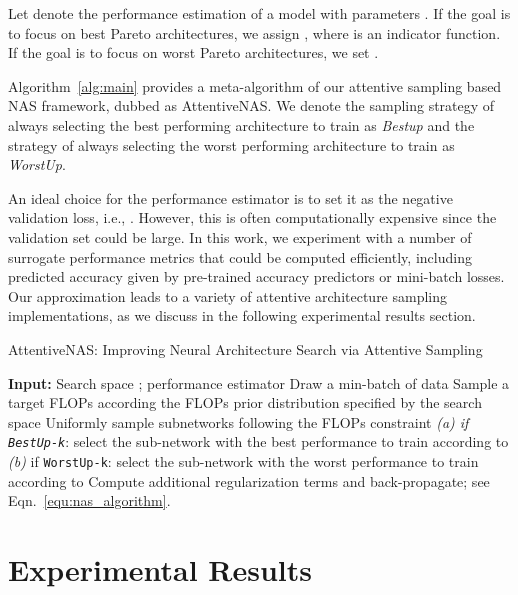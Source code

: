 \documentclass[final]{cvpr}
\theoremstyle{definition}
\begin{document}
Let  denote the performance estimation of a model  with parameters .
If the goal is to focus on best {Pareto} architectures, 
we assign , where  is an indicator function. 
If the goal is to focus on worst {Pareto} architectures, 
we set . 

Algorithm~\ref{alg:main} provides a meta-algorithm of our attentive sampling based NAS framework, dubbed as {AttentiveNAS}. 
We denote the sampling strategy of always selecting the best performing architecture to train as \textit{Bestup} and the strategy of always selecting the worst performing architecture to train as \textit{WorstUp}.

An ideal choice for the performance estimator  is to set it as the negative validation loss, i.e., . 
However, this is often computationally expensive since the validation set could be large. 
In this work, 
we experiment with a number of surrogate performance metrics that could be computed efficiently,
including predicted accuracy given by pre-trained accuracy predictors or mini-batch losses.
Our approximation leads to a variety of attentive architecture sampling implementations, 
as we discuss in the following experimental results section.




\begin{algorithm}[t]
\caption{AttentiveNAS: Improving Neural Architecture Search via Attentive Sampling}
\label{alg:main}
\begin{algorithmic}[1]
    \STATE \textbf{Input:} Search space ; performance estimator 
        \STATE Draw a min-batch of data
        \FOR{} 
        \STATE Sample a target FLOPs  according the FLOPs prior distribution specified by the search space 
        \STATE Uniformly sample  subnetworks  following the FLOPs constraint  
        \STATE \emph{(a) if \texttt{BestUp-k}}: select the sub-network with the best performance to train according to 
        \STATE \emph{(b)} if \texttt{WorstUp-k}: select the sub-network with the worst performance to train according to 
        \ENDFOR
        \STATE Compute additional regularization terms and back-propagate; see Eqn.~\eqref{equ:nas_algorithm}. 
    \ENDWHILE
\end{algorithmic}
\end{algorithm}



 
\section{Experimental Results}
\label{sec:exp}
\end{document}
